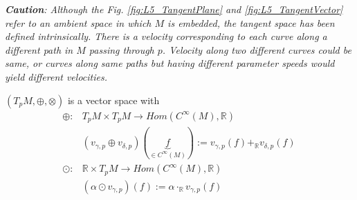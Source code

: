 \textit{\textbf{Caution}: Although the Fig. \ref{fig:L5_TangentPlane} and \ref{fig:L5_TangentVector} refer to an ambient space in which $M$ is embedded, the tangent space has been defined intrinsically. There is a velocity corresponding to each curve along a different path in $M$ passing through $p$. Velocity along two different curves could be same, or curves along same paths but having different parameter speeds would yield different velocities.}

\begin{theorem}
$(T_pM, \oplus, \otimes)$ is a vector space with 
\begin{align*}
  \oplus : & T_pM \times T_pM \to Hom(C^\infty(M),\mathbb{R})  \\
  & (v_{\gamma,p} \oplus v_{\delta,p})(\underbrace{f}_{ \in C^{\infty}(M)} ) := v_{\gamma,p}(f) +_{\mathbb{R}} v_{\delta,p}(f) \\
  \odot : & \mathbb{R} \times T_pM \to Hom(C^{\infty}(M),\mathbb{R}) \\
  & (\alpha \odot v_{\gamma,p} )(f) := \alpha \cdot_{\mathbb{R}}  v_{\gamma, p}(f)
\end{align*}
\end{theorem}

